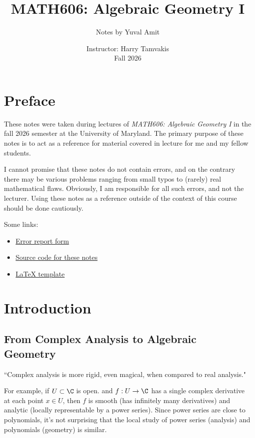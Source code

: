 \documentclass[11pt]{report}
\title{MATH606: Algebraic Geometry I}
\author{Notes by Yuval Amit}
\date{Instructor: Harry Tamvakis \\ Fall 2026}
\begin{document}
\maketitle
\setcounter{page}{2}

\chapter*{Preface}
These notes were taken during lectures of \textit{MATH606: Algebraic Geometry I} in the fall 2026 semester at the University of Maryland. The primary purpose of these notes is to act as a reference for material covered in lecture for me and my fellow students. 

I cannot promise that these notes do not contain errors, and on the contrary there may be various problems ranging from small typos to (rarely) real mathematical flaws. Obviously, I am responsible for all such errors, and not the lecturer. Using these notes as a reference outside of the context of this course should be done cautiously. 

Some links:
\begin{itemize}
    \item \href{https://docs.google.com/forms/d/e/1FAIpQLSdhZbMDXPyvQ3KKiL1MLr5d0WGBrnASU8-LFDA73ICSnwH_Og/viewform?usp=publish-editor}{Error report form}
    \item \href{https://github.com/YuvalAmit2/yuvals-notes/tree/main/math606-notes}{Source code for these notes}
    \item \href{https://github.com/YuvalAmit2/yalatex}{LaTeX template}
\end{itemize}

\newpage
\tableofcontents
\newpage

\chapter{Introduction}

\section{From Complex Analysis to Algebraic Geometry}

``Complex analysis is more rigid, even magical, when compared to real analysis."

For example, if $U \subset \C$ is open. and $f:U \to \C$ has a single complex derivative at each point $x \in U$, then $f$ is smooth (has infinitely many derivatives) and analytic (locally representable by a power series). Since power series are close to polynomials, it's not surprising that the local study of power series (analysis) and polynomials (geometry) is similar.
\end{document}
